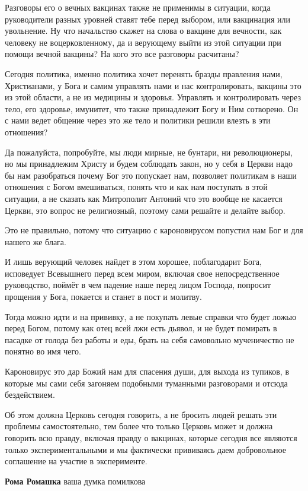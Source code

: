 \begin{itemize}
Разговоры его о вечных вакцинах также не применимы в ситуации, когда
руководители разных уровней ставят тебе перед выбором, или вакцинация или
увольнение. Ну что начальство скажет на слова о вакцине для вечности, как
человеку не воцерковленному, да и верующему выйти из этой ситуации при помощи
вечной вакцины? На кого это все разговоры расчитаны?

Сегодня политика, именно политика хочет перенять бразды правления нами,
Христианами, у Бога и самим управлять нами и нас контролировать, вакцины это из
этой области, а не из медицины и здоровья. Управлять и контролировать через
тело, его здоровье, имунитет, что также принадлежит Богу и Ним сотворено. Он с
нами ведет общение через это же тело и политики решили влезть в эти отношения?

Да пожалуйста, попробуйте, мы люди мирные, не бунтари, ни революционеры, но мы
принадлежим Христу и будем соблюдать закон, но у себя в Церкви надо бы нам
разобраться почему Бог это попускает нам, позволяет политикам в наши отношения
с Богом вмешиваться, понять что и как нам поступать в этой ситуации, а не
сказать как Митрополит Антоний что это вообще не касается Церкви, это вопрос не
религиозный, поэтому сами решайте и делайте выбор.

Это не правильно, потому что ситуацию с кароновирусом попустил нам Бог и для
нашего же блага.

И лишь верующий человек найдет в этом хорошее, поблагодарит Бога, исповедует
Всевышнего перед всем миром, включая свое непосредственное руководство, поймёт
в чем падение наше перед лицом Господа, попросит прощения у Бога, покается и
станет в пост и молитву.

Тогда можно идти и на прививку, а не покупать левые справки что будет ложью
перед Богом, потому как отец всей лжи есть дьявол, и не будет помирать в
пасадке от голода без работы и еды, брать на себя самовольно мученичество не
понятно во имя чего.

Кароновирус это дар Божий нам для спасения души, для выхода из тупиков, в
которые мы сами себя загоняем подобными туманными разговорами и отсюда
бездействием.

Об этом должна Церковь сегодня говорить, а не бросить людей решать эти проблемы
самостоятельно, тем более что только Церковь может и должна говорить всю
правду, включая правду о вакцинах, которые сегодня все являются только
экспериментальными и мы фактически прививаясь даем добровольное соглашение на
участие в эксперименте.

\begin{itemize} %
\textbf{Рома Ромашка} ваша думка помилкова
\end{itemize} %


\end{itemize}
